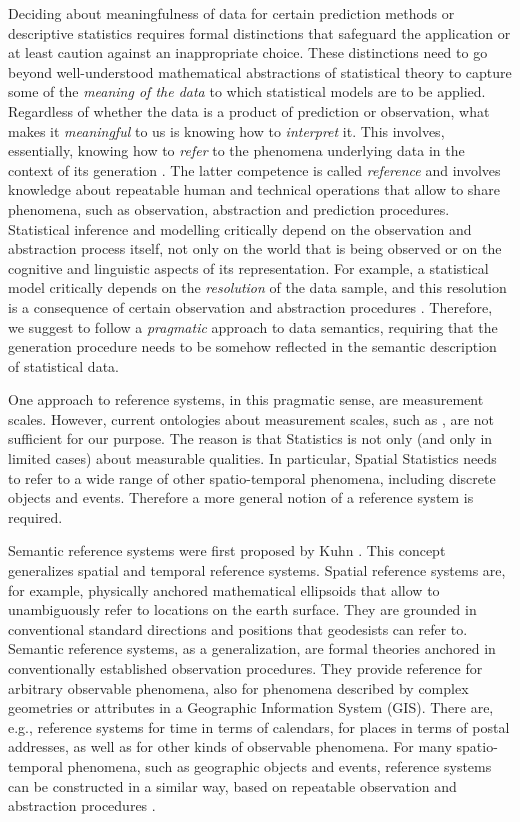 \documentclass[final,authoryear,1p,times]{elsarticle}
\begin{document}
Deciding about meaningfulness of data for certain prediction methods or descriptive statistics requires formal distinctions that safeguard the application or at least caution against an inappropriate choice. These distinctions need to go beyond well-understood mathematical abstractions of statistical theory to capture some of the \textit{meaning of the data} to which statistical models are to be applied. Regardless of whether the data is a product of prediction or observation, what makes it \textit{meaningful} to us is knowing how to \textit{interpret} it. This involves, essentially, knowing how to \textit{refer} to the phenomena underlying data in the context of its generation \citep{Scheider.2011c}. The latter competence is called \textit{reference} and involves knowledge about repeatable human and technical operations that allow to share phenomena, such as observation, abstraction and prediction procedures. Statistical inference and modelling critically depend on the observation and abstraction process itself, not only on the world that is being observed or on the cognitive and linguistic aspects of its representation. For example, a statistical model critically depends on the \textit{resolution} of the data sample, and this resolution is a consequence of certain observation and abstraction procedures \citep{Frank2009}. Therefore, we suggest to follow a \textit{pragmatic} approach to data semantics, requiring that the generation procedure needs to be somehow reflected in the semantic description of statistical data.

One approach to reference systems, in this pragmatic sense, are measurement scales. However, current ontologies about measurement scales, such as \citep{Rijgersberg2012}, are not sufficient for our purpose. The reason is that Statistics is not only (and only in limited cases) about measurable qualities. In particular, Spatial Statistics needs to refer to a wide range of other spatio-temporal phenomena, including discrete objects and events. Therefore a more general notion of a reference system is required. 

Semantic reference systems were first proposed by Kuhn \citep{Kuhn2003}. This concept generalizes spatial and temporal reference systems. Spatial reference systems are, for example, physically anchored mathematical ellipsoids that allow to unambiguously refer to locations on the earth surface. They are grounded in conventional standard directions and positions that geodesists can refer to. Semantic reference systems, as a generalization, are formal theories anchored in conventionally established observation procedures. They provide reference for arbitrary observable phenomena, also for phenomena described by complex geometries or attributes in a Geographic Information System (GIS). There are, e.g., reference systems for time in terms of calendars, for places in terms of postal addresses, as well as for other kinds of observable phenomena. For many spatio-temporal phenomena, such as geographic objects and events, reference systems can be constructed in a similar way, based on repeatable observation and abstraction procedures \citep{Scheider.2011c}. 
\end{document}
